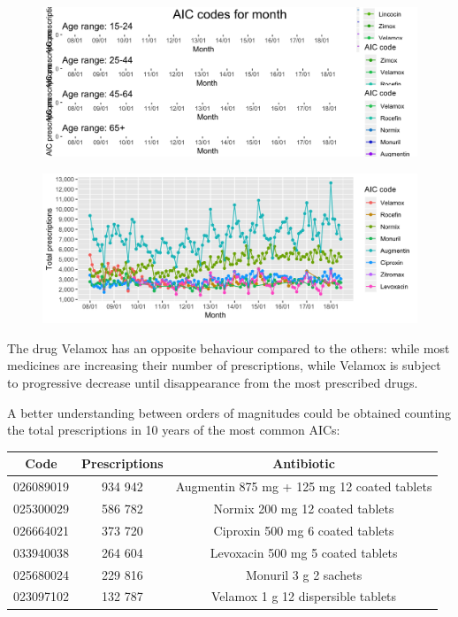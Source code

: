 \begin{figure}[h]
	\centering
	\includegraphics[scale=0.3]{../plots/top_aic-year.png}
\end{figure}

\begin{figure}[h]
	\centering
	\includegraphics[scale=0.3]{../plots/top_aic-month.png}
\end{figure}

The drug Velamox has an opposite behaviour compared to the others: while most medicines are increasing their number of prescriptions, while Velamox is subject to progressive decrease until disappearance from the most prescribed drugs.

A better understanding between orders of magnitudes could be obtained counting the total prescriptions in 10 years of the most common AICs:

\begin{center}
	\begin{tabular}{|c|c|c|}
		\hline
		Code & Prescriptions & Antibiotic \\
		\hline
		026089019 & 934 942 & Augmentin 875 mg + 125 mg 12 coated tablets \\
		\hline
		025300029 & 586 782 & Normix 200 mg 12 coated tablets\\
		\hline
		026664021 & 373 720 & Ciproxin 500 mg 6 coated tablets \\
		\hline
		033940038 & 264 604 & Levoxacin 500 mg 5 coated tablets \\
		\hline
		025680024 & 229 816 & Monuril 3 g 2 sachets \\
		\hline
		023097102 & 132 787 & Velamox 1 g 12 dispersible tablets \\
		\hline
	\end{tabular}
\end{center}

